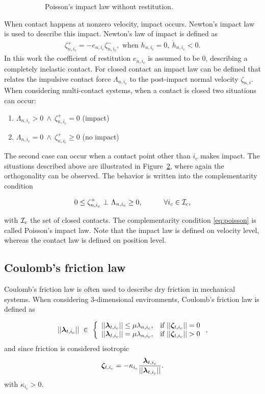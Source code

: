 \documentclass[../DC2017114Bouma.tex]{subfiles}
\begin{document}
\begin{figure}[h]
\begin{subfigure}{0.3\textwidth}
\caption{Poisson's impact law without restitution.}\label{fig:poissonimpact}
\end{subfigure}
\caption{}
\end{figure}

When contact happens at nonzero velocity, impact occurs. Newton's impact law is used to describe this impact. Newton's law of impact is defined as
\begin{align}
\zeta^+_{n,i_c} = -e_{n,i_c}\zeta^-_{n,i_c},\text{ when }h_{n,i_c}=0,\ \dot{h}_{n,i_c}<0.
\end{align}
In this work the coefficient of restitution $e_{n,i_c}$ is assumed to be $0$, describing a completely inelastic contact. For closed contact an impact law can be defined that relates the impulsive contact force $\Lambda_{n,i_c}$ to the post-impact normal velocity $\zeta_{n,i}$. When considering multi-contact systems, when a contact is closed two situations can occur:
\begin{enumerate}
\item $\Lambda_{n,i_c} > 0\ \wedge\ \zeta^+_{n,i_c} = 0$ (impact)
\item $\Lambda_{n,i_c} = 0\ \wedge\ \zeta^+_{n,i_c} \geq 0$ (no impact)
\end{enumerate}
The second case can occur when a contact point other than $i_c$ makes impact. The situations described above are illustrated in Figure~\ref{fig:poissonimpact}, where again the orthogonality can be observed. The behavior is written into the complementarity condition

\begin{align}
0\leq \zeta^+_{n,i_c}\ \bot\ \Lambda_{n,i_c} \geq 0,\quad  \qquad \forall i_c\in\mathcal{I}_c,\label{eq:poisson}
\end{align}

with $\mathcal{I}_c$ the set of closed contacts. The complementarity condition \eqref{eq:poisson} is called Poisson's impact law. Note that the impact law is defined on velocity level, whereas the contact law is defined on position level.
\subsection{Coulomb's friction law}
Coulomb's friction law is often used to describe dry friction in mechanical systems. When considering 3-dimensional environments, Coulomb's friction law is defined as 

\begin{align}
||\lambdab_{t,i_c}||\ \in\ \left\{ \begin{array}{ll}
||\lambdab_{t,i_c}||\leq\mu\lambda_{n,i_c}, &\text{if }||\zetab_{t,i_c}||=0\\
||\lambdab_{t,i_c}|| = \mu\lambda_{n,i_c}, &\text{if }||\zetab_{t,i_c}||>0
\end{array}\right.,\label{eq:frictionlen}
\end{align}
and since friction is considered isotropic
\begin{align}
\boldsymbol{\zeta}_{t,i_c} = -\kappa_{i_c}\frac{\boldsymbol{\lambda}_{t,i_c}}{||\boldsymbol{\lambda}_{t,i_c}||}.\label{eq:frictiondir}
\end{align}
with $\kappa_{i_c}>0$.
\end{document}
